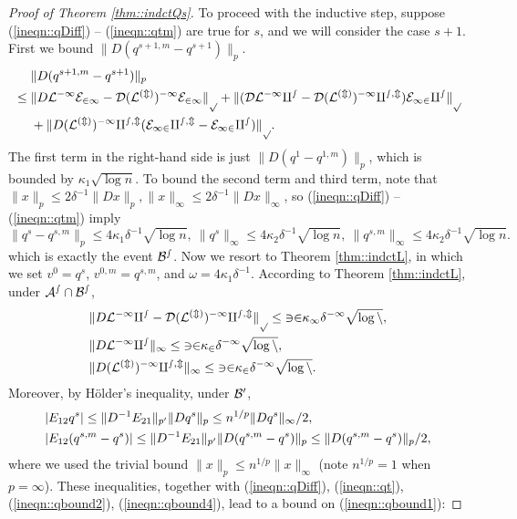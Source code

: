 \documentclass[12pt]{article}%
\theoremstyle{plain}%
\theoremstyle{remark}
\begin{document}
\begin{proof}[Proof of Theorem \ref{thm::indctQs}]
To proceed with the inductive step, suppose (\ref{ineqn::qDiff}) -- (\ref{ineqn::qtm}) are true for $s$, and we will consider the case $s+1$. First we bound $\| D(q^{s+1,m} - q^{s+1})\|_p$. 
\begin{align}
& ~~~~ \| D(q^{s+1,m} - q^{s+1}) \|_p \notag \\
&\le \| D\cal{L}^{-1}E_{21} - D(\cal{L}^{(m)})^{-1} E_{21} \|_p + \| ( D\cal{L}^{-1} q^s - D(\cal{L}^{(m)})^{-1} q^{s,m} ) E_{12} q^s \|_p  \notag \\  
&  ~~~~ + \| D(\cal{L}^{(m)})^{-1} q^{s,m} ( E_{12} q^{s,m} - E_{12}q^s ) \|_p. \label{ineqn::qbound1}
\end{align}
The first term in the right-hand side is just $\| D(q^1 - q^{1,m}) \|_p$, which is bounded by $\kappa_1 \sqrt{\log n}$. To bound the second term and third term, note that $\| x \|_p \le 2\delta^{-1}\| D x \|_p, \| x \|_\infty \le 2\delta^{-1} \| Dx \|_\infty$, so (\ref{ineqn::qDiff}) -- (\ref{ineqn::qtm}) imply 
\begin{equation}\label{ineqn::q1}
\| q^s - q^{s,m} \|_{p} \le 4\kappa_1 \delta^{-1} \sqrt{\log n}, ~ \| q^s \|_{\infty} \le 4\kappa_2 \delta^{-1} \sqrt{\log n}, ~ \| q^{s,m} \|_{\infty} \le 4\kappa_2 \delta^{-1} \sqrt{\log n}.
\end{equation}
which is exactly the event $\cal{B}^s$. Now we resort to Theorem \ref{thm::indctL}, in which we set $v^0 = q^s$, $v^{0,m} = q^{s,m}$, and $\omega = 4\kappa_1\delta^{-1}$. According to Theorem \ref{thm::indctL}, under $\cal{A}^s\cap \cal{B}^s$,
\begin{align}
&\| D\cal{L}^{-1} q^s - D(\cal{L}^{(m)})^{-1} q^{s,m} \|_p \le 32\kappa_1\delta^{-1} \sqrt{\log n}, \label{ineqn::qbound2}\\
&\| D\cal{L}^{-1} q^{s} \|_{\infty} \le 32\kappa_2\delta^{-1} \sqrt{\log n}, \label{ineqn::qbound3}\\
&\| D(\cal{L}^{(m)})^{-1} q^{s,m} \|_{\infty} \le 32\kappa_2\delta^{-1} \sqrt{\log n}. \label{ineqn::qbound4}
\end{align}
Moreover, by H\"{o}lder's inequality, under $\cal{B}^0$,
\begin{align}
&| E_{12} q^s | \le \| D^{-1} E_{21} \|_{p'} \| D q^s \|_{p} \le n^{1/p} \| D q^s \|_\infty / 2, \label{ineqn::qbound5}\\
& | E_{12} (q^{s,m} - q^s) | \le \|  D^{-1}E_{21} \|_{p'} \| D (q^{s,m} - q^s) \|_{p} \le  \| D (q^{s,m} - q^s) \|_{p} /2, \notag
\end{align}
where we used the trivial bound $\| x \|_p \le n^{1/p} \| x \|_\infty$ (note $n^{1/p}=1$ when $p=\infty$). These inequalities, together with (\ref{ineqn::qDiff}), (\ref{ineqn::qt}), (\ref{ineqn::qbound2}), (\ref{ineqn::qbound4}), lead to a bound on (\ref{ineqn::qbound1}):

\end{proof}
\end{document}
